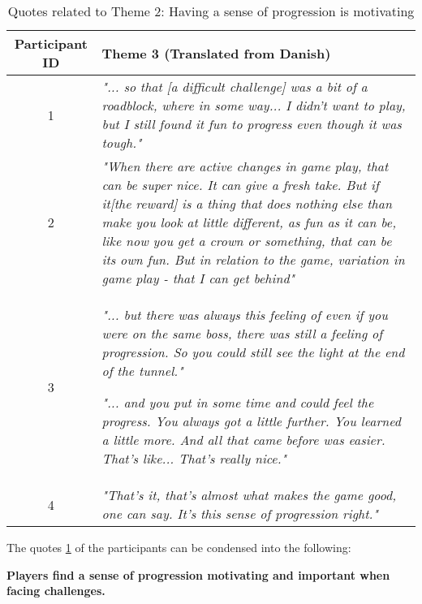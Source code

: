 \begin{table}[H]

\centering
\begin{tabular}{@{}c p{11cm}@{}}
\toprule
\textbf{Participant ID} & \textbf{Theme 3} (Translated from Danish)\\
\midrule

1 & \textit{"... so that [a difficult challenge] was a bit of a roadblock, where in some way... I didn't want to play, but I still found it fun to progress even though it was tough."}\\

\midrule

2 & \textit{"When there are active changes in game play, that can be super nice. It can give a fresh take. But if it[the reward] is a thing that does nothing else than make you look at little different, as fun as it can be, like now you get a crown or something, that can be its own fun. But in relation to the game, variation in game play - that I can get behind"}\\

\midrule

3& \textit{"... but there was always this feeling of even if you were on the same boss, there was still a feeling of progression. So you could still see the light at the end of the tunnel."}

\vspace{0.3cm}

\textit{"... and you put in some time and could feel the progress. You always got a little further. You learned a little more. And all that came before was easier. That's like... That's really nice."}\\

\midrule

4 & \textit{"That's it, that's almost what makes the game good, one can say. It's this sense of progression right."}\\

\bottomrule
\end{tabular}

\caption{Quotes related to Theme 2: Having a sense of progression is motivating}
\label{tab:theme3-quotes}
\end{table}

The quotes \ref{tab:theme3-quotes} of the participants can be condensed into the following:
\begin{center}
    \textbf{Players find a sense of progression motivating and important when facing challenges.}
\end{center}

